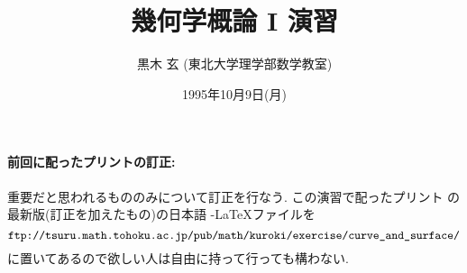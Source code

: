 \documentclass[12pt,twoside]{jarticle}
\begin{document}

\title{\bf 幾何学概論 I 演習}

\author{黒木 玄 \quad (東北大学理学部数学教室)}

\date{1995年10月9日(月)}

\maketitle


\paragraph{前回に配ったプリントの訂正:}

重要だと思われるもののみについて訂正を行なう. この演習で配ったプリント
の最新版(訂正を加えたもの)の日本語 \AmS-\LaTeX ファイルを
\[
\text{\tt ftp://tsuru.math.tohoku.ac.jp/pub/math/kuroki/exercise/curve\_and\_surface/}
\]
に置いてあるので欲しい人は自由に持って行っても構わない.
\end{document}
